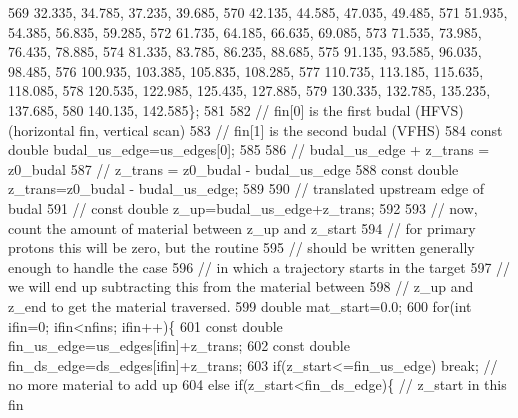 \begin{DoxyCode}
569                                   32.335, 34.785, 37.235, 39.685,
570                                   42.135, 44.585, 47.035, 49.485,
571                                   51.935, 54.385, 56.835, 59.285,
572                                   61.735, 64.185, 66.635, 69.085,
573                                   71.535, 73.985, 76.435, 78.885,
574                                   81.335, 83.785, 86.235, 88.685,
575                                   91.135, 93.585, 96.035, 98.485,
576                                   100.935, 103.385, 105.835, 108.285,
577                                   110.735, 113.185, 115.635, 118.085,
578                                   120.535, 122.985, 125.435, 127.885,
579                                   130.335, 132.785, 135.235, 137.685,
580                                   140.135, 142.585\};
581     
582     \textcolor{comment}{// fin[0] is the first budal (HFVS) (horizontal fin, vertical scan)}
583     \textcolor{comment}{// fin[1] is the second budal (VFHS)}
584     \textcolor{keyword}{const} \textcolor{keywordtype}{double} budal\_us\_edge=us\_edges[0]; 
585 
586     \textcolor{comment}{// budal\_us\_edge + z\_trans = z0\_budal}
587     \textcolor{comment}{// z\_trans = z0\_budal - budal\_us\_edge}
588     \textcolor{keyword}{const} \textcolor{keywordtype}{double} z\_trans=z0\_budal - budal\_us\_edge;
589     
590     \textcolor{comment}{// translated upstream edge of budal}
591     \textcolor{comment}{//    const double z\_up=budal\_us\_edge+z\_trans;}
592     
593     \textcolor{comment}{// now, count the amount of material between z\_up and z\_start}
594     \textcolor{comment}{// for primary protons this will be zero, but the routine}
595     \textcolor{comment}{// should be written generally enough to handle the case}
596     \textcolor{comment}{// in which a trajectory starts in the target}
597     \textcolor{comment}{// we will end up subtracting this from the material between}
598     \textcolor{comment}{// z\_up and z\_end to get the material traversed.}
599     \textcolor{keywordtype}{double} mat\_start=0.0;
600     \textcolor{keywordflow}{for}(\textcolor{keywordtype}{int} ifin=0; ifin<nfins; ifin++)\{
601       \textcolor{keyword}{const} \textcolor{keywordtype}{double} fin\_us\_edge=us\_edges[ifin]+z\_trans;
602       \textcolor{keyword}{const} \textcolor{keywordtype}{double} fin\_ds\_edge=ds\_edges[ifin]+z\_trans;
603       \textcolor{keywordflow}{if}(z\_start<=fin\_us\_edge) \textcolor{keywordflow}{break}; \textcolor{comment}{// no more material to add up}
604       \textcolor{keywordflow}{else} \textcolor{keywordflow}{if}(z\_start<fin\_ds\_edge)\{ \textcolor{comment}{// z\_start in this fin}

\end{DoxyCode}
